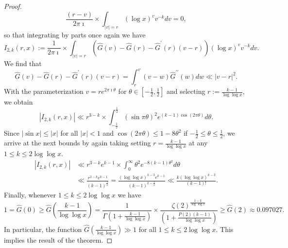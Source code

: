 \documentclass[11pt,reqno,a4letter]{article}
\numberwithin{figure}{section}
\numberwithin{table}{section}
\theoremstyle{plain}
\numberwithin{theorem}{section}
\theoremstyle{definition}
\begin{document}
\begin{proof}
\[
\frac{(r-v)}{2\pi\imath} \times \int_{|v|=r} (\log x)^v v^{-k} dv = 0, 
\]
so that integrating by parts once again we have 
\[
I_{2,k}(r, x) := \frac{1}{2\pi\imath} \times \int_{|v|=r} 
     \left(\widehat{G}(v) - \widehat{G}(r) - 
     \widehat{G}^{\prime}(r)(v-r)\right) 
     (\log x)^{v} v^{-k} dv. 
\]
We find that 
\[
\widehat{G}(v) - \widehat{G}(r) - \widehat{G}^{\prime}(r)(v-r) = 
     \int_{r}^{v} (v-w) \widehat{G}^{\prime\prime}(w) dw 
     \ll |v-r|^2. 
\]
With the parameterization $v = re^{2\pi\imath\theta}$ for 
$\theta \in \left[-\frac{1}{2}, \frac{1}{2}\right]$ and 
selecting $r := \frac{k-1}{\log\log x}$, we obtain 
\[
|I_{2,k}(r, x)| \ll r^{3-k} \times 
     \int_{-\frac{1}{2}}^{\frac{1}{2}} (\sin \pi\theta)^2 e^{(k-1) \cos(2\pi\theta)} d\theta. 
\]
Since $|\sin x| \leq |x|$ for all $|x| < 1$ and $\cos(2\pi\theta) \leq 1 - 8\theta^2$ if 
$-\frac{1}{2} \leq \theta \leq \frac{1}{2}$, we arrive at the next bounds by again taking 
setting $r = \frac{k-1}{\log\log x}$ at any $1 \leq k \leq 2\log\log x$. 
\begin{align*}
|I_{2,k}(r, x)| & \ll r^{3-k} e^{k-1} \times \int_0^{\infty} \theta^2 e^{-8(k-1) \theta^2} d\theta \\ 
     & \ll \frac{r^{3-k} e^{k-1}}{(k-1)^{\frac{3}{2}}} = 
     \frac{(\log\log x)^{k-3} e^{k-1}}{(k-1)^{k-\frac{3}{2}}} 
     \ll 
     \frac{k (\log\log x)^{k-3}}{(k-1)!}. 
\end{align*}
Finally, whenever $1 \leq k \leq 2\log\log x$ we have 
\[
1 = \widehat{G}(0) \geq \widehat{G}\left(\frac{k-1}{\log\log x}\right) = 
     \frac{1}{\Gamma\left(1+\frac{k-1}{\log\log x}\right)} \times 
     \frac{\zeta(2)^{\frac{1-k}{\log\log x}}}{\left(1+\frac{P(2)(k-1)}{\log\log x}\right)} 
     \geq \widehat{G}(2) \approx 0.097027. 
\]
In particular, the function 
$\widehat{G}\left(\frac{k-1}{\log\log x}\right) \gg 1$ for 
all $1 \leq k \leq 2\log\log x$. 
This implies the result of the theorem. 
\end{proof} 
\end{document}
